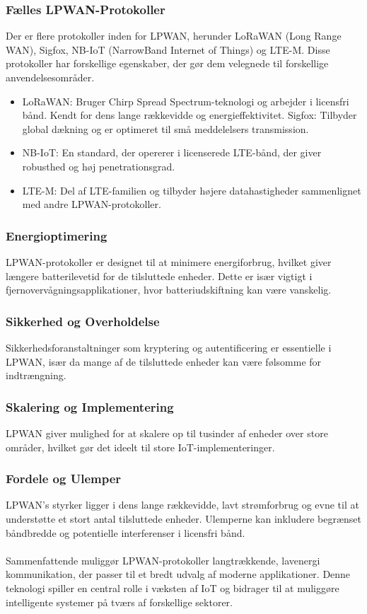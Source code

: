 \subsubsection{Fælles LPWAN-Protokoller}
Der er flere protokoller inden for LPWAN, herunder LoRaWAN (Long Range WAN), Sigfox, NB-IoT (NarrowBand Internet of Things) og LTE-M. Disse protokoller har forskellige egenskaber, der gør dem velegnede til forskellige anvendelsesområder.
\begin{itemize}
	\item LoRaWAN: Bruger Chirp Spread Spectrum-teknologi og arbejder i licensfri bånd. Kendt for dens lange rækkevidde og energieffektivitet.
	Sigfox: Tilbyder global dækning og er optimeret til små meddelelsers transmission.
	\item NB-IoT: En standard, der opererer i licenserede LTE-bånd, der giver robusthed og høj penetrationsgrad.
	\item LTE-M: Del af LTE-familien og tilbyder højere datahastigheder sammenlignet med andre LPWAN-protokoller.
\end{itemize}
\subsubsection{Energioptimering}
LPWAN-protokoller er designet til at minimere energiforbrug, hvilket giver længere batterilevetid for de tilsluttede enheder. Dette er især vigtigt i fjernovervågningsapplikationer, hvor batteriudskiftning kan være vanskelig.
\subsubsection{Sikkerhed og Overholdelse}
Sikkerhedsforanstaltninger som kryptering og autentificering er essentielle i LPWAN, især da mange af de tilsluttede enheder kan være følsomme for indtrængning.
\subsubsection{Skalering og Implementering}
LPWAN giver mulighed for at skalere op til tusinder af enheder over store områder, hvilket gør det ideelt til store IoT-implementeringer.

\subsubsection{Fordele og Ulemper}
LPWAN's styrker ligger i dens lange rækkevidde, lavt strømforbrug og evne til at understøtte et stort antal tilsluttede enheder. Ulemperne kan inkludere begrænset båndbredde og potentielle interferenser i licensfri bånd.
\\
\\
Sammenfattende muliggør LPWAN-protokoller langtrækkende, lavenergi kommunikation, der passer til et bredt udvalg af moderne applikationer. Denne teknologi spiller en central rolle i væksten af IoT og bidrager til at muliggøre intelligente systemer på tværs af forskellige sektorer.

